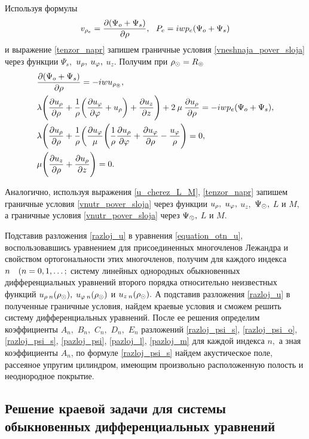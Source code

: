 Используя формулы
$$v_{\rho_e}=\frac{\partial(\Psi_{o}+\Psi_s)}{\partial\rho},\:\:\: P_e=iwp_e(\Psi_{o}+\Psi_s)$$
и выражение \eqref{tenzor_napr} запишем граничные условия \eqref{vneshnaja_pover_sloja} через функции $\Psi_s,$ $u_\rho,$ $u_\varphi,$ $u_z$. Получим при $\rho_\odot=R_\circledcirc$
\begin{align}
&\frac{\partial(\Psi_{o}+\Psi_s)}{\partial\rho}=-iwu_{\rho_\circledcirc},\\
&\lambda\Biggl(\frac{\partial u_{\rho}}{\partial \rho}+\frac{1}{\rho}\biggl(\frac{\partial u_\varphi}{\partial\varphi}+u_{\rho}\biggr)+\frac{\partial u_z}{\partial z}\Biggr)+2\:\mu\:\frac{\partial u_{\rho}}{\partial \rho}=-iwp_e(\Psi_{o}+\Psi_s),\\
&\lambda\Biggl(\frac{\partial u_{\rho}}{\partial \rho}+\frac{1}{\rho}\biggl(\frac{\partial u_\varphi}\mu\Biggl(\frac{1}{\rho}\frac{\partial u_{\rho}}{\partial\varphi}+\frac{\partial u_\varphi}{\partial \rho}-\frac{u_{\varphi}}{\rho}\Biggr)=0,\\
&\mu\Biggl(\frac{\partial u_z}{\partial \rho}+\frac{\partial u_{\rho}}{\partial z}\Biggr)=0.
\end{align}

Аналогично, используя выражения \eqref{u_cherez_L_M}, \eqref{tenzor_napr} запишем граничные условия \eqref{vnutr_pover_sloja} через функции $u_\rho,$ $u_\varphi,$ $u_z,$ $ \Psi_\odot,$ $L$ и $M ,$ а граничные условия \eqref{vnutr_pover_sloja} через $\Psi_\odot,$ $L$ и $M.$

Подставив разложения \eqref{razloj_u} в уравнения \eqref{equation_otn_u}, воспользовавшись уравнением для присоединенных многочленов Лежандра и свойством ортогональности этих многочленов, получим для каждого индекса $n \quad(n = 0,1,\ldots;$ систему линейных однородных обыкновенных дифференциальных уравнений второго порядка относительно неизвестных функций $u_{\rho\:n}(\rho_\odot),$ $u_{\varphi\:n}(\rho_\odot)$ и $u_{z\:n}(\rho_\odot).$ А подставив разложения \eqref{razloj_u} в полученные граничные условия, найдем краевые условия и сможем решить  систему дифференциальных уравнений. После ее решения определим коэффициенты $A_n,$ $B_n,$ $C_n,$ $D_n,$ $E_n$ разложений  \eqref{razloj_psi_s}, \eqref{razloj_psi_o}, \eqref{razloj_psi_s}, \eqref{pazloj_psi}, \eqref{pazloj_l}, \eqref{pazloj_m} для каждой индекса $n,$ а зная коэффициенты ${A}_{n}$, по формуле \eqref{razloj_psi_s} найдем акустическое поле, рассеяное упругим цилиндром, имеющим произвольно расположенную полость и неоднородное покрытие.
\newpage
\subsection{Решение краевой задачи для системы обыкновенных дифференциальных уравнений}

